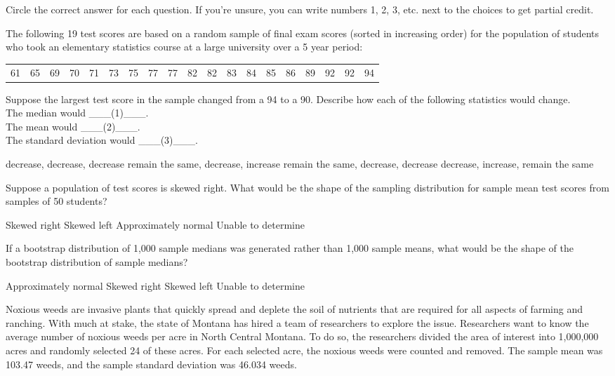 \documentclass{article}
\begin{document}
	Circle the correct answer for each question.  If you're unsure, you can write numbers 1, 2, 3, etc. next to the choices to get partial credit.\\[.5cm]
	\begin{mcquestions}
		
		\question The following 19 test scores are based on a random sample of final exam scores (sorted in increasing order) for the population of students who took an elementary statistics course at a large university over a 5 year period:
		
		\begin{tabular}{ccccccccccccccccccc}
			61 &  65 &  69  & 70  & 71 &  73  & 75 &  77 &  77 &  82  & 82 &  83 &  84 &  85 &  86 &  89 &  92  & 92 &  94
		\end{tabular}
		
		Suppose the largest test score in the sample changed from a 94 to a 90. Describe how each of the following statistics would change.\\
		The median would \_\_\_(1)\_\_\_.\\
		The mean would \_\_\_(2)\_\_\_.\\
		The standard deviation would \_\_\_(3)\_\_\_.
		
		\begin{mcanswerslist}
			\answer decrease, decrease, decrease
			\answer remain the same, decrease, increase
			\answer[correct] remain the same, decrease, decrease
			\answer decrease, increase, remain the same			
		\end{mcanswerslist}
		
		\question Suppose a population of test scores is skewed right. What would be the shape of the sampling distribution for sample mean test scores from samples of 50 students?
		\begin{mcanswerslist}
			\answer Skewed right
			\answer Skewed left
			\answer[correct] Approximately normal
			\answer Unable to determine
		\end{mcanswerslist}
		
		\question If a bootstrap distribution of 1,000 sample medians was generated rather than 1,000 sample means, what would be the shape of the bootstrap distribution of sample medians?
		\begin{mcanswerslist}
			\answer Approximately normal
			\answer Skewed right
			\answer Skewed left
			\answer[correct] Unable to determine
		\end{mcanswerslist}
		
		\begin{mcquestioninstruction}
			Noxious weeds are invasive plants that quickly spread and deplete the soil of nutrients that are required for all aspects of farming and ranching. With much at stake, the state of Montana has hired a team of researchers to explore the issue. Researchers want to know the average number of noxious weeds per acre in North Central Montana. To do so, the researchers divided the area of interest into 1,000,000 acres and randomly selected 24 of these acres. For each selected acre, the noxious weeds were counted and removed. The sample mean was 103.47 weeds, and the sample standard deviation was 46.034 weeds.
		\end{mcquestioninstruction}
		

\end{mcquestions}
\end{document}
